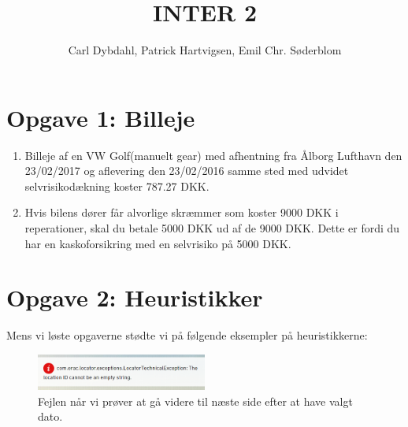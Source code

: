 \documentclass[a4paper]{article}
\title{INTER 2}
\author{Carl Dybdahl, Patrick Hartvigsen, Emil Chr. Søderblom}
\begin{document}
\maketitle

\section*{Opgave 1: Billeje}
\begin{enumerate}
\item Billeje af en VW Golf(manuelt gear) med afhentning fra Ålborg Lufthavn den 23/02/2017 og aflevering den 23/02/2016 samme sted med udvidet selvrisikodækning koster 787.27 DKK.
\item Hvis bilens dører får alvorlige skræmmer som koster 9000 DKK i reperationer, skal du betale 5000 DKK ud af de 9000 DKK. Dette er fordi du har en kaskoforsikring med en selvrisiko på 5000 DKK.
\end{enumerate}

\section*{Opgave 2: Heuristikker}

Mens vi løste opgaverne stødte vi på følgende eksempler på heuristikkerne:

\begin{figure}[!ht]
\centering
\includegraphics[width=0.5\textwidth]{error0.png}
\caption{Fejlen når vi prøver at gå videre til næste side efter at have valgt dato.}
\label{error-next}
\end{figure}
\end{document}
